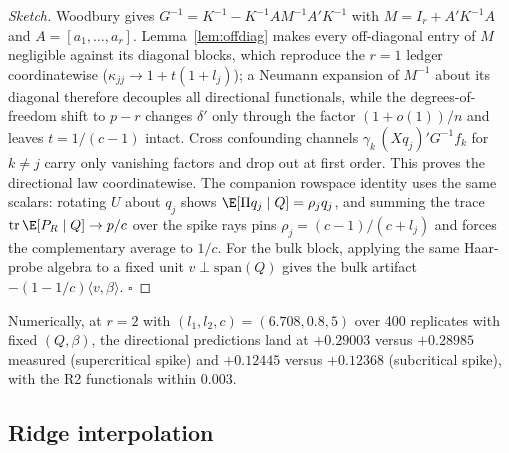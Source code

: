 \begin{proof}[Sketch]
Woodbury gives $G^{-1}=K^{-1}-K^{-1}AM^{-1}A'K^{-1}$ with $M=I_r+A'K^{-1}A$ and $A=[a_1,\dots,a_r]$. Lemma~\ref{lem:offdiag} makes every off-diagonal entry of $M$ negligible against its diagonal blocks, which reproduce the $r=1$ ledger coordinatewise ($\kappa_{jj}\to 1+t(1+l_j)$); a Neumann expansion of $M^{-1}$ about its diagonal therefore decouples all directional functionals, while the degrees-of-freedom shift to $p-r$ changes $\delta'$ only through the factor $(1+o(1))/n$ and leaves $t=1/(c-1)$ intact. Cross confounding channels $\gamma_k\,(Xq_j)'G^{-1}f_k$ for $k\ne j$ carry only vanishing factors and drop out at first order.
This proves the directional law coordinatewise. The companion rowspace identity uses the same scalars: rotating $U$ about $q_j$ shows $\E[\Pi q_j\mid Q]=\rho_jq_j$, and summing the trace $\operatorname{tr}\E[P_R\mid Q]\to p/c$ over the spike rays pins $\rho_j=(c-1)/(c+l_j)$ and forces the complementary average to $1/c$. For the bulk block, applying the same Haar-probe algebra to a fixed unit $v\perp\mathrm{span}(Q)$ gives the bulk artifact $-(1-1/c)\langle v,\beta\rangle$. $\square$
\end{proof}

Numerically, at $r=2$ with $(l_1,l_2,c)=(6.708,0.8,5)$ over 400 replicates with fixed $(Q,\beta)$, the directional predictions land at $+0.29003$ versus $+0.28985$ measured (supercritical spike) and $+0.12445$ versus $+0.12368$ (subcritical spike), with the R2 functionals within $0.003$.

\subsection{Ridge interpolation}\label{subsec:ridge}

